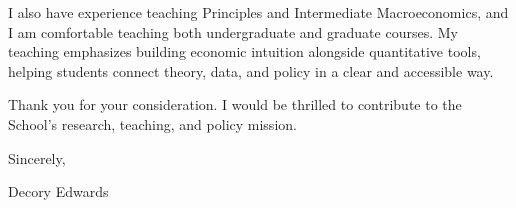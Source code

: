 \documentclass[11pt]{letter}
\begin{document}
\begin{letter}{}
I also have experience teaching Principles and Intermediate Macroeconomics, and I am comfortable teaching both undergraduate and graduate courses. My teaching emphasizes building economic intuition alongside quantitative tools, helping students connect theory, data, and policy in a clear and accessible way.

Thank you for your consideration. I would be thrilled to contribute to the School’s research, teaching, and policy mission.

\closing{Sincerely,}

\vspace{0.5cm}

Decory Edwards

\end{letter}
\end{document}
